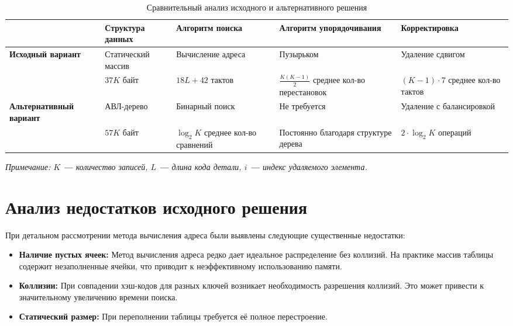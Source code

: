 \documentclass{bmstu}
\begin{document}
    \begin{table}[H]
        \centering
        \small
        \renewcommand{\arraystretch}{1.8}
        \begin{tabular}{|>{\centering\arraybackslash}p{4cm}|>{\centering\arraybackslash}p{2.5cm}|>{\centering\arraybackslash}p{2.5cm}|>{\centering\arraybackslash}p{3cm}|>{\centering\arraybackslash}p{3.1cm}|}
            \hline
            & \textbf{Структура данных} & \textbf{Алгоритм поиска} & \textbf{Алгоритм упорядочивания} & \textbf{Корректировка} \\
            \hline
            \textbf{Исходный вариант} & Статический массив & Вычисление адреса & Пузырьком & Удаление сдвигом \\
            \cline{2-5}
            & $37K$ байт & $18L + 42$ тактов & \(\displaystyle \frac{K(K-1)}{2}\)   среднее кол-во перестановок & $(K-1)\cdot 7$ среднее кол-во тактов\\
            \hline
            \textbf{Альтернативный вариант} & АВЛ-дерево & Бинарный поиск & Не требуется & Удаление с балансировкой \\
            \cline{2-5}
            & $57K$ байт & $\log_2 K$ среднее кол-во сравнений & Постоянно благодаря структуре дерева &  $2 \cdot \log_2 K$ операций \\
            \hline
        \end{tabular}
        \caption{Сравнительный анализ исходного и альтернативного решения}
    \end{table}

    \vspace{-0.3cm}
    \begin{flushleft}
        \textit{Примечание: $K$ \textbf{—} количество записей, $L$ \textbf{—} длина кода детали, $i$ \textbf{—} индекс удаляемого элемента.}
    \end{flushleft}

\section*{Анализ недостатков исходного решения}
При детальном рассмотрении метода вычисления адреса были выявлены следующие существенные недостатки:
\begin{itemize}
    \item \textbf{Наличие пустых ячеек:} Метод вычисления адреса редко дает идеальное распределение без коллизий. На практике массив таблицы содержит незаполненные ячейки, что приводит к неэффективному использованию памяти.
    \item \textbf{Коллизии:} При совпадении хэш-кодов для разных ключей возникает необходимость разрешения коллизий. Это может привести к значительному увеличению времени поиска.
    \item \textbf{Статический размер:} При переполнении таблицы требуется её полное перестроение.
\end{itemize}
\end{document}
